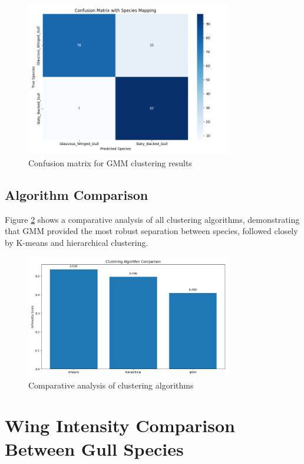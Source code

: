 \documentclass[a4paper,12pt]{report}
\begin{document}
\begin{figure}[H]
    \centering
    \includegraphics[width=0.8\textwidth]{images/clustering/gmm_confusion_matrix.png}
    \caption{Confusion matrix for GMM clustering results}
    \label{fig:gmm_confusion_matrix}
\end{figure}

\subsection{Algorithm Comparison}
Figure \ref{fig:algorithm_comparison} shows a comparative analysis of all clustering algorithms, demonstrating that GMM provided the most robust separation between species, followed closely by K-means and hierarchical clustering.

\begin{figure}[H]
    \centering
    \includegraphics[width=0.8\textwidth]{images/clustering/algorithm_comparison.png}
    \caption{Comparative analysis of clustering algorithms}
    \label{fig:algorithm_comparison}
\end{figure}

\section{Wing Intensity Comparison Between Gull Species}
\end{document}
